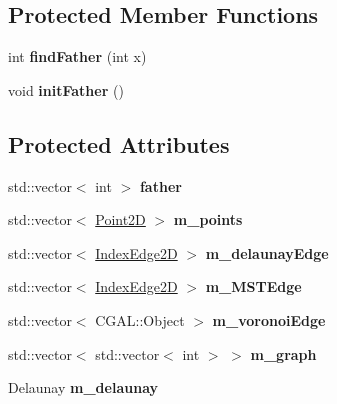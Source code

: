 \subsection*{Protected Member Functions}
\begin{DoxyCompactItemize}
\item 
int {\bfseries find\+Father} (int x)\hypertarget{classcmst_1_1_graph2_d_a0b860daa24f288eea5f490e12fcb67e2}{}\label{classcmst_1_1_graph2_d_a0b860daa24f288eea5f490e12fcb67e2}

\item 
void {\bfseries init\+Father} ()\hypertarget{classcmst_1_1_graph2_d_a5de76dfe02b4a13e0d3fe9a5e7ea7285}{}\label{classcmst_1_1_graph2_d_a5de76dfe02b4a13e0d3fe9a5e7ea7285}

\end{DoxyCompactItemize}
\subsection*{Protected Attributes}
\begin{DoxyCompactItemize}
\item 
std\+::vector$<$ int $>$ {\bfseries father}\hypertarget{classcmst_1_1_graph2_d_ad5d251f2f6f8b827af4404985fcec53c}{}\label{classcmst_1_1_graph2_d_ad5d251f2f6f8b827af4404985fcec53c}

\item 
std\+::vector$<$ \hyperlink{classcmst_1_1_point2_d}{Point2D} $>$ {\bfseries m\+\_\+points}\hypertarget{classcmst_1_1_graph2_d_a32456f3c630e34a56ce3109183142c10}{}\label{classcmst_1_1_graph2_d_a32456f3c630e34a56ce3109183142c10}

\item 
std\+::vector$<$ \hyperlink{classcmst_1_1_index_edge2_d}{Index\+Edge2D} $>$ {\bfseries m\+\_\+delaunay\+Edge}\hypertarget{classcmst_1_1_graph2_d_a6fe64b2078ec3c700a8a2e2bd77e2dae}{}\label{classcmst_1_1_graph2_d_a6fe64b2078ec3c700a8a2e2bd77e2dae}

\item 
std\+::vector$<$ \hyperlink{classcmst_1_1_index_edge2_d}{Index\+Edge2D} $>$ {\bfseries m\+\_\+\+M\+S\+T\+Edge}\hypertarget{classcmst_1_1_graph2_d_a1cc96b5251162964ac21f46955ac8271}{}\label{classcmst_1_1_graph2_d_a1cc96b5251162964ac21f46955ac8271}

\item 
std\+::vector$<$ C\+G\+A\+L\+::\+Object $>$ {\bfseries m\+\_\+voronoi\+Edge}\hypertarget{classcmst_1_1_graph2_d_a05e5ea6746bfd9d0ccd47308f4bbf1af}{}\label{classcmst_1_1_graph2_d_a05e5ea6746bfd9d0ccd47308f4bbf1af}

\item 
std\+::vector$<$ std\+::vector$<$ int $>$ $>$ {\bfseries m\+\_\+graph}\hypertarget{classcmst_1_1_graph2_d_a5df9c78edb4f5c68da11b01e44061dc5}{}\label{classcmst_1_1_graph2_d_a5df9c78edb4f5c68da11b01e44061dc5}

\item 
Delaunay {\bfseries m\+\_\+delaunay}\hypertarget{classcmst_1_1_graph2_d_af19557df59901e6078c2038652c95623}{}\label{classcmst_1_1_graph2_d_af19557df59901e6078c2038652c95623}

\end{DoxyCompactItemize}



